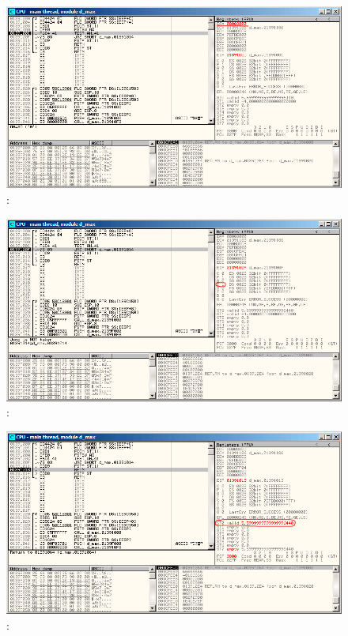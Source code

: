 \begin{figure}[H]
\centering
\includegraphics[scale=\FigScale]{patterns/12_FPU/3_comparison/x86/MSVC_Ox/olly2_3.png}
\caption{\olly: \FNSTSW {}}
\label{fig:FPU_comparison_Ox_case2_olly3}
\end{figure}

\begin{figure}[H]
\centering
\includegraphics[scale=\FigScale]{patterns/12_FPU/3_comparison/x86/MSVC_Ox/olly2_4.png}
\caption{\olly: \TEST {}}
\label{fig:FPU_comparison_Ox_case2_olly4}
\end{figure}

\begin{figure}[H]
\centering
\includegraphics[scale=\FigScale]{patterns/12_FPU/3_comparison/x86/MSVC_Ox/olly2_5.png}
\caption{\olly: \FSTP {}}
\label{fig:FPU_comparison_Ox_case2_olly5}
\end{figure}
\fi
